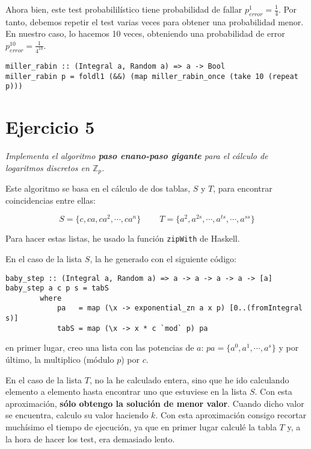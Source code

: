 \documentclass[10pt,spanish]{article}
\begin{document}
Ahora bien, este test probabililístico tiene probabilidad de fallar $p_{error}^1 = \frac{1}{4}$. Por tanto, debemos repetir el test varias veces para obtener una probabilidad menor. En nuestro caso, lo hacemos 10 veces, obteniendo una probabilidad de error $p_{error}^{10} = \frac{1}{4^{10}}$.

\begin{verbatim}
miller_rabin :: (Integral a, Random a) => a -> Bool
miller_rabin p = foldl1 (&&) (map miller_rabin_once (take 10 (repeat p))) 
\end{verbatim}

\section{\textcolor{rojo}Ejercicio 5}
\textit{Implementa el algoritmo \textbf{\textcolor{rojo}{paso enano-paso gigante}} para el cálculo de logaritmos discretos en $\mathbb{Z}_p$.}

Este algoritmo se basa en el cálculo de dos tablas, $S$ y $T$, para encontrar coincidencias entre ellas:

\begin{displaymath}
S = \{c, ca, ca^2, \cdots, ca^n\} \qquad\ T = \{a^2, a^{2s}, \cdots, a^{ts}, \cdots, a^{ss}\}
\end{displaymath}

Para hacer estas listas, he usado la función \texttt{zipWith} de Haskell. 

En el caso de la lista $S$, la he generado con el siguiente código:

\begin{verbatim}
baby_step :: (Integral a, Random a) => a -> a -> a -> a -> [a]
baby_step a c p s = tabS
        where
            pa   = map (\x -> exponential_zn a x p) [0..(fromIntegral s)]
            tabS = map (\x -> x * c `mod` p) pa
\end{verbatim}

en primer lugar, creo una lista con las potencias de $a$: $pa = \{a^0, a^1, \cdots, a^s\}$ y por último, la multiplico (módulo $p$) por $c$.

En el caso de la lista $T$, no la he calculado entera, sino que he ido calculando elemento a elemento hasta encontrar uno que estuviese en la lista $S$. Con esta aproximación, \textbf{\textcolor{rojo}{sólo obtengo la solución de menor valor}}. Cuando dicho valor se encuentra, calculo su valor haciendo $k$. Con esta aproximación consigo recortar muchísimo el tiempo de ejecución, ya que en primer lugar calculé la tabla $T$ y, a la hora de hacer los test, era demasiado lento.
\end{document}
